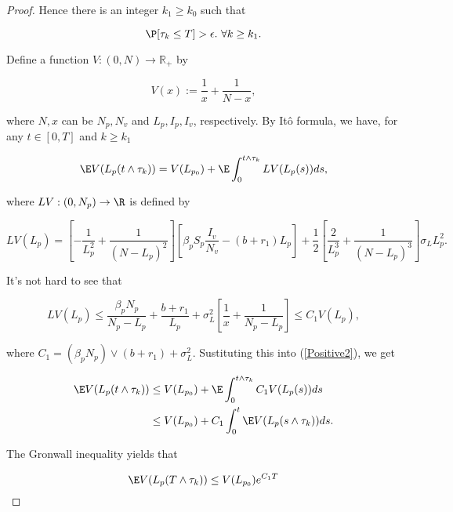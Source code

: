\begin{proof}
	Hence there is an integer $k_1\geq k_0$ such that
	
	\begin{equation}\label{Positive1}
		\P[\tau_k\leq T]>\epsilon.\,\,\forall k\geq k_1.
	\end{equation}
	
	Define a function $V:(0,N)\rightarrow \mathbb{R}_+$ by
	
	\begin{equation*}
		V(x) := \frac{1}{x}+ \frac{1}{N-x},
	\end{equation*}
	
	where $N,x$ can be $N_p,N_v$ and $L_p,I_p,I_v$, respectively. By It\^{o} formula, we have, for any $t\in[0,T]$ and $k\geq k_1$
	
	\begin{equation}\label{Positive2}
		\E V(L_p(t\wedge\tau_k)) = V(L_{p_0})+ \E \int_{0}^{t\wedge \tau_k} LV(L_p(s))ds,
	\end{equation}
	
	where $LV:(0,N_p)\rightarrow \R$ is defined by 
	
	\begin{equation*}
		LV(L_p) = \left[-\frac{1}{L_p^2}+\frac{1}{(N-L_p)^2}\right]\left[\beta_pS_p\frac{I_v}{N_v}-(b+r_1)L_p\right]+\frac{1}{2}\left[\frac{2}{L_p^3}+\frac{1}{(N-L_p)^3}\right]\sigma_L L_p^2.
	\end{equation*}
	
	It's not hard to see that
	
	\begin{equation*}
		LV(L_p) \leq \frac{\beta_p N_p}{N_p-L_p}+\frac{b+r_1}{L_p}+\sigma_L^2\left[\frac{1}{x}+\frac{1}{N_p-L_p}\right]\leq C_1 V(L_p),
	\end{equation*}
	
	where $C_1 = (\beta_p N_p)\vee (b+r_1)+\sigma_L^2$. Sustituting this into (\ref{Positive2}), we get 
	
	\begin{align*}
		\E V(L_p(t\wedge\tau_k)) 
			&\leq 
				V(L_{p_0})+ \E \int_{0}^{t\wedge \tau_k} C_1V(L_p(s))ds\\
			&\leq 
				V(L_{p_0})+C_1\int_{0}^{t}\E V(L_p(s\wedge \tau_k))ds.
	\end{align*}
	
	The Gronwall inequality yields that
	
	\begin{equation}\label{Positive3}
		\E V(L_p(T\wedge \tau_k))\leq V(L_{p_0})e^{C_1 T}
	\end{equation}
	

\end{proof}
